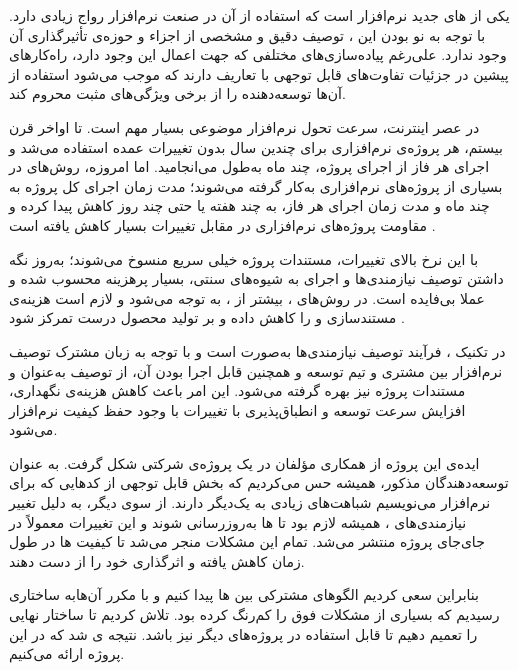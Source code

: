     یکی
از ‌های جدید  نرم‌افزار است که استفاده از آن در صنعت
نرم‌افزار رواج زیادی دارد. با توجه به نو بودن این ،
توصیف دقیق و مشخصی از اجزاء و حوزه‌ی تأثیرگذاری آن وجود ندارد. علی‌رغم
پیاده‌سازی‌های مختلفی که جهت اعمال این  وجود دارد،
راه‌کارهای پیشین در جزئیات تفاوت‌های قابل توجهی با تعاریف
 دارند که موجب می‌شود استفاده از آن‌ها توسعه‌دهنده را از
برخی ویژگی‌های مثبت  محروم کند.

در عصر اینترنت، سرعت تحول نرم‌افزار موضوعی بسیار مهم است. تا اواخر قرن
بیستم، هر پروژه‌ی نرم‌افزاری برای چندین سال بدون تغییرات عمده استفاده
می‌شد و اجرای هر فاز از اجرای پروژه، چند ماه به‌طول می‌انجامید. اما
امروزه، روش‌های  در بسیاری از پروژه‌های نرم‌افزاری به‌کار
گرفته می‌شوند؛ مدت زمان اجرای کل پروژه به چند ماه و مدت زمان اجرای هر
فاز، به چند هفته یا حتی چند روز کاهش پیدا کرده و مقاومت پروژه‌های
نرم‌افزاری در مقابل تغییرات بسیار کاهش یافته است .

با این نرخ بالای تغییرات، مستندات پروژه خیلی سریع منسوخ می‌شوند؛ به‌روز
نگه داشتن توصیف نیازمندی‌ها و اجرای  به شیوه‌های سنتی، بسیار
پرهزینه محسوب شده و عملا بی‌فایده است. در روش‌های ،
بیشتر از ، به
 توجه می‌شود و لازم
است هزینه‌ی مستندسازی و  را کاهش داده و بر تولید محصول درست
تمرکز شود .

در تکنیک ، فرآیند توصیف نیازمندی‌ها به‌صورت
 است و با توجه به زبان مشترک توصیف نرم‌افزار بین مشتری و
تیم توسعه و همچنین قابل اجرا بودن آن، از توصیف به‌عنوان  و
مستندات پروژه نیز بهره گرفته می‌شود. این امر باعث کاهش هزینه‌ی نگهداری،
افزایش سرعت توسعه  و انطباق‌پذیری با تغییرات با وجود حفظ
کیفیت نرم‌افزار می‌شود.

ایده‌ی این پروژه از همکاری مؤلفان در یک پروژه‌ی شرکتی شکل گرفت. به عنوان توسعه‌دهندگان  مذکور، همیشه حس می‌کردیم که بخش قابل توجهی از کدهایی که برای  نرم‌افزار می‌نویسیم شباهت‌های زیادی به یک‌دیگر دارند.
از سوی دیگر، به دلیل تغییر نیازمندی‌های ، همیشه لازم بود تا ‌ها به‌روزرسانی شوند و این تغییرات معمولاً در جای‌جای پروژه منتشر می‌شد. تمام این مشکلات منجر می‌شد تا کیفیت ‌ها در طول زمان کاهش یافته و اثرگذاری خود را از دست دهند.

بنابراین سعی کردیم الگوهای مشترکی بین ‌ها پیدا کنیم و با  مکرر آن‌هابه ساختاری رسیدیم که بسیاری از مشکلات فوق را کم‌رنگ کرده بود. تلاش کردیم تا ساختار نهایی را تعمیم دهیم تا قابل استفاده در پروژه‌های دیگر نیز باشد. نتیجه  ی شد که در این پروژه ارائه می‌کنیم.

